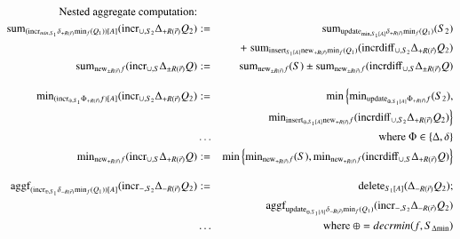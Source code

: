 \documentclass{article}
\begin{document}
%
\begin{figure*}
\begin{eqnarray}
\mbox{Nested aggregate computation:} && \nonumber
\\
\label{eq:na1}
\algsum_{(\algincr_{min, S_1} \delta_{+R(\vec{r})} \algmin_{f}(Q_1))[A]}
(\algincr_{\cup,S_2} \Delta_{+R(\vec{r})} Q_2)
&:=&
\algsum_{\algupdate_{\min, S_{1}[A]} \delta_{+R(\vec{r})} \algmin_{f}(Q_1)}(S_2)
\\
\nonumber &&
+ \; \algsum_{\alginsert_{S_{1}[A]} \algnew_{+R(\vec{r})} \algmin_{f}(Q_1)}
    (\algincrdiff_{\cup, S_2} \Delta_{+R(\vec{r})} Q_2)
\\
\label{eq:na2}
\algsum_{\algnew_{\pm R(\vec{r})} f} (\algincr_{\cup,S} \Delta_{\pm R(\vec{r})} Q)
&:=&
\algsum_{\algnew_{\pm R(\vec{r})} f}(S) 
    \pm \algsum_{\algnew_{\pm R(\vec{r})} f}
        (\algincrdiff_{\cup, S} \Delta_{\pm R(\vec{r})} Q)
%
%
\\[2ex]
\label{eq:na3}
\algmin_{(\algincr_{\oplus, S_1} \Phi_{+ R(\vec{r})} f)[A]}
(\algincr_{\cup, S_2} \Delta_{+R(\vec{r})} Q_2)
&:=&
\min \Big\{
\algmin_{\algupdate_{\oplus, S_1[A]} \Phi_{+R(\vec{r})} f} (S_2),
\\
\nonumber &&
\qquad \; \algmin_{\alginsert_{\oplus, S_1[A]} \algnew_{+R(\vec{r})} f}
(\algincrdiff_{\cup, S_2} \Delta_{+R(\vec{r})} Q_2)
\Big\}
\\
\nonumber &\dots& \mbox{where $\Phi \in \{\Delta, \delta\}$}
\\
%
%
\label{eq:na4}
\algmin_{\algnew_{+R(\vec{r})} f} (\algincr_{\cup, S} \Delta_{+R(\vec{r})} Q)
&:=&
\min \Big\{
\algmin_{\algnew_{+R(\vec{r})} f} (S), 
\algmin_{\algnew_{+R(\vec{r})} f} (\algincrdiff_{\cup, S} \Delta_{+R(\vec{r})} Q)
\Big\}
%
%
%
\\[2ex]
\label{eq:na5}
\algaggf_{(\algincr_{\oplus, S_1} \delta_{-R(\vec{r})} \algmin_{f}(Q_1))[A]}
(\algincr_{-,S_2} \Delta_{-R(\vec{r})} Q_2)
&:=&
\algdelete_{S_{1}[A]}(\Delta_{-R(\vec{r})} Q_2);
\\
\nonumber &&
\algaggf_{\algupdate_{\oplus, S_{1}[A]}  \delta_{-R(\vec{r})} \algmin_{f}(Q_1)}
(\algincr_{-,S_2} \Delta_{-R(\vec{r})} Q_2)
\\
\nonumber &\dots& \mbox{where $\oplus = decrmin(f, S_{\Delta \algmin})$}
\end{eqnarray}
\end{figure*}



\begin{comment}



\end{comment}
\end{document}
